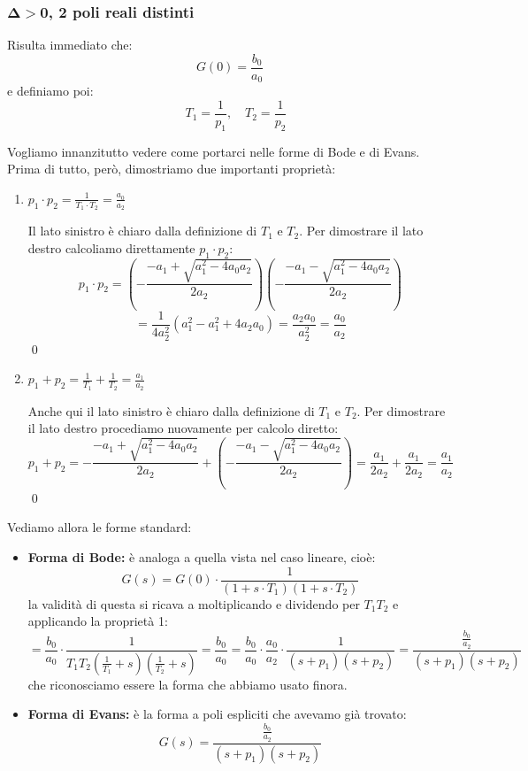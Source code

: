 \documentclass[a4paper,11pt]{article}
\begin{document}
\subsubsection{$\mathbf{\Delta > 0}$, 2 poli reali distinti}
Risulta immediato che:
$$G(0) = \frac{b_0}{a_0}$$
e definiamo poi:
$$
\quad T_1 = \frac{1}{p_1}, \quad T_2 = \frac{1}{p_2}
$$

Vogliamo innanzitutto vedere come portarci nelle forme di Bode e di Evans.
Prima di tutto, però, dimostriamo due importanti proprietà:
\begin{enumerate}
	\item $p_1 \cdot p_2 = \frac{1}{T_1 \cdot T_2} = \frac{a_0}{a_2}$ \par\smallskip 
		Il lato sinistro è chiaro dalla definizione di $T_1$ e $T_2$.
		Per dimostrare il lato destro calcoliamo direttamente $p_1 \cdot p_2$:
		$$
		p_1 \cdot p_2 = \left( - \frac{-a_1 + \sqrt{a_1^2 - 4 a_0 a_2}}{2 a_2} \right) \left( - \frac{-a_1 - \sqrt{a_1^2 - 4 a_0 a_2}}{2 a_2} \right)
		$$
		$$
		= \frac{1}{4a_2^2} \left( a_1^2 - a_1^2 + 4a_2a_0 \right) = \frac{a_2 a_0}{a_2^2} = \frac{a_0}{a_2}
		$$ \qed
		
	\item $p_1 + p_2 = \frac{1}{T_1} + \frac{1}{T_2} = \frac{a_1}{a_2}$ \par\smallskip
		Anche qui il lato sinistro è chiaro dalla definizione di $T_1$ e $T_2$.
		Per dimostrare il lato destro procediamo nuovamente per calcolo diretto:
		$$
		p_1 + p_2 = - \frac{-a_1 + \sqrt{a_1^2 - 4 a_0 a_2}}{2 a_2} + \left( - \frac{-a_1 - \sqrt{a_1^2 - 4 a_0 a_2}}{2 a_2} \right) = \frac{a_1}{2 a_2} + \frac{a_1}{2 a_2} = \frac{a_1}{a_2}
		$$ \qed
\end{enumerate}

Vediamo allora le forme standard:
\begin{itemize}
	\item \textbf{Forma di Bode:} è analoga a quella vista nel caso lineare, cioè:
	$$
	G(s) = G(0) \cdot \frac{1}{(1 + s \cdot T_1)(1 + s \cdot T_2)}
	$$
	la validità di questa si ricava a moltiplicando e dividendo per $T_1 T_2$ e applicando la proprietà 1:
	$$
	= \frac{b_0}{a_0} \cdot \frac{1}{T_1 T_2 (\frac{1}{T_1} + s)(\frac{1}{T_2} + s)} = \frac{b_0}{a_0} = \frac{b_0}{a_0} \cdot \frac{a_0}{a_2} \cdot \frac{1}{(s + p_1)(s + p_2)} = \frac{\frac{b_0}{a_2}}{(s + p_1)(s + p_2)}
	$$ 
	che riconosciamo essere la forma che abbiamo usato finora.
	\item \textbf{Forma di Evans:} è la forma a poli espliciti che avevamo già trovato:
	$$
	G(s) = \frac{\frac{b_0}{a_2}}{(s + p_1)(s + p_2)}
	$$
\end{itemize}
\end{document}
